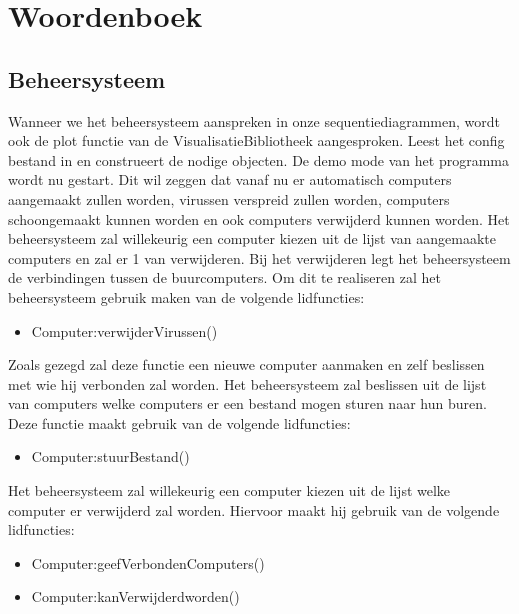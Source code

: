 \documentclass[a4paper,oneside]{report}
\begin{document}

\newpage
\section{Woordenboek}
\subsection{Beheersysteem}
Wanneer we het beheersysteem aanspreken in onze sequentiediagrammen, wordt ook de plot functie van de VisualisatieBibliotheek aangesproken.
 Leest het config bestand in en construeert de nodige objecten.
 De demo mode van het programma wordt nu gestart. Dit wil zeggen dat vanaf nu er automatisch computers aangemaakt zullen worden, virussen verspreid zullen worden, computers schoongemaakt kunnen worden en ook computers verwijderd kunnen worden.
 Het beheersysteem zal willekeurig een computer kiezen uit de lijst van aangemaakte computers en zal er 1 van verwijderen. Bij het verwijderen legt het beheersysteem de verbindingen tussen de buurcomputers. Om dit te realiseren zal het beheersysteem gebruik maken van de volgende lidfuncties:
\begin{itemize}
    \item Computer:verwijderVirussen()
\end{itemize}
 Zoals gezegd zal deze functie een nieuwe computer aanmaken en zelf beslissen met wie hij verbonden zal worden.
 Het beheersysteem zal beslissen uit de lijst van computers welke computers er een bestand mogen sturen naar hun buren. Deze functie maakt gebruik van de volgende lidfuncties:
\begin{itemize}
    \item Computer:stuurBestand()
\end{itemize}
 Het beheersysteem zal willekeurig een computer kiezen uit de lijst welke computer er verwijderd zal worden. Hiervoor maakt hij gebruik van de volgende lidfuncties:
\begin{itemize}
    \item Computer:geefVerbondenComputers()
    \item Computer:kanVerwijderdworden()
\end{itemize}
\end{document}
